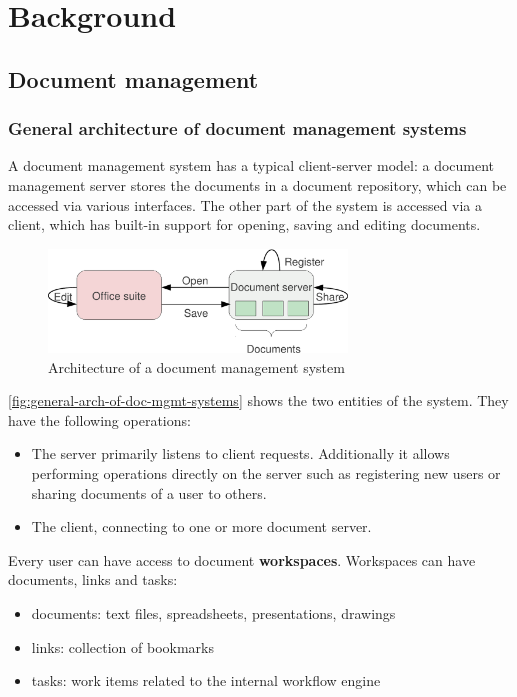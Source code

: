 \chapter{Background}

\section{Document management}

\subsection{General architecture of document management systems}

A document management system has a typical client-server model: a document
management server stores the documents in a document repository, which can be
accessed via various interfaces.  The other part of the system is accessed via a client,
which has built-in support for opening, saving and editing documents.

\begin{figure}[H]
\centering
\includegraphics[width=300px,keepaspectratio]{general-arch-of-doc-mgmt-systems.pdf}
\caption{Architecture of a document management system}
\label{fig:general-arch-of-doc-mgmt-systems}
\end{figure}

\autoref{fig:general-arch-of-doc-mgmt-systems} shows the two entities of the
system. They have the following operations:

\begin{itemize}
\item The server primarily listens to client requests. Additionally it allows
performing operations directly on the server such as registering new users or
sharing documents of a user to others.
\item The client, connecting to one or more document server.
\end{itemize}

Every user can have access to document \textbf{workspaces}.  Workspaces can
have documents, links and tasks:

\begin{itemize}
\item documents: text files, spreadsheets, presentations, drawings
\item links: collection of bookmarks
\item tasks: work items related to the internal workflow engine
\end{itemize}

